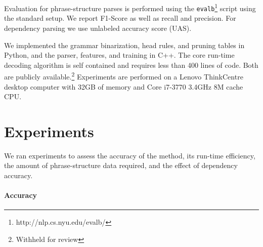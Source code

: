 \documentclass[11pt,letterpaper]{article}
\begin{document}
Evaluation for phrase-structure parses is performed using the
\texttt{evalb}\footnote{http://nlp.cs.nyu.edu/evalb/} script using the
standard setup. We report F1-Score as well as recall and
precision. For dependency parsing we use unlabeled accuracy score
(UAS).

We implemented the grammar binarization, head rules, and pruning
tables in Python, and the parser, features, and training in C++. The
core run-time decoding algorithm is self contained and requires less
than 400 lines of code. Both are publicly available.\footnote{Withheld
  for review} Experiments are performed on a Lenovo ThinkCentre desktop computer
with 32GB of memory and  Core i7-3770 3.4GHz 8M cache CPU.

\section{Experiments}
\label{sec:exper}

We ran experiments to assess the accuracy of the method, its run-time efficiency, the amount of phrase-structure data required, and the effect of dependency accuracy.

\paragraph{Accuracy}
\end{document}
